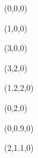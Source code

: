 \pstThreeDCoor[xMin=-2,xMax=2,yMin=-2,yMax=2,zMin=-2,zMax=2]

\pstThreeDDot(0,0,0)

\pstThreeDDot(1,0,0)

\pstThreeDDot(3,0,0)

\pstThreeDDot(3,2,0)

\pstThreeDDot(1.2,2,0)

\pstThreeDDot(0,2,0)

\pstThreeDDot(0,0.9,0)

\pstThreeDDot(2,1.1,0)
